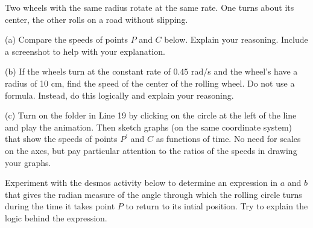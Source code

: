 \documentclass{ximera}
\begin{document}
\begin{exploration}\label{exp:angles2}
Two wheels with the same radius rotate at the same rate. One turns about its center, the other rolls on a road without slipping.

(a) Compare the speeds of points $P$ and $C$ below. Explain your reasoning. Include a screenshot to help with your explanation.

(b) If the wheels turn at the constant rate of $0.45$ rad/s and the wheel's have a radius of 10 cm, find the speed of the center of the rolling wheel. Do not use a  formula. Instead, do this logically and explain your reasoning. 

(c) Turn on the folder in Line 19 by clicking on the circle at the left of the line and play the animation. Then sketch graphs (on the same coordinate system) that show the speeds of points $P^\prime$ and $C$ as functions of time. No need for scales on the axes, but pay particular attention to the ratios of the speeds in drawing  your graphs.


 
\begin{onlineOnly}
    \begin{center}
\end{center}
\end{onlineOnly}
\end{exploration}



\begin{exploration}\label{exp:angles2}
Experiment with the desmos activity below to determine an expression in $a$ and $b$ that gives the radian measure of the angle through which the rolling circle turns during the time it takes point $P$ to return to its intial position. Try to explain the logic behind the expression.


 
\begin{onlineOnly}
    \begin{center}
\end{center}
\end{onlineOnly}
\end{exploration}
\end{document}
